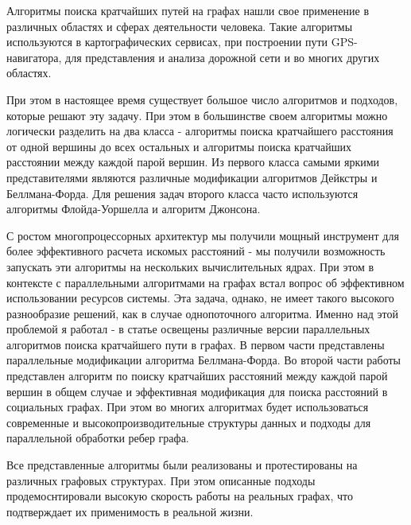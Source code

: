 \startprefacepage

Алгоритмы поиска кратчайших путей на графах нашли свое применение в различных областях и сферах деятельности человека. Такие алгоритмы используются в картографических сервисах, при построении пути GPS-навигатора, для представления и анализа дорожной сети и во многих других областях.
 
При этом в настоящее время существует большое число алгоритмов и подходов, которые решают эту задачу. При этом в большинстве своем алгоритмы можно логически разделить на два класса - алгоритмы поиска кратчайшего расстояния от одной вершины до всех остальных и алгоритмы поиска кратчайших расстоянии между каждой парой вершин. Из первого класса самыми яркими представителями являются различные модификации алгоритмов Дейкстры и Беллмана-Форда. Для решения задач второго класса часто используются алгоритмы Флойда-Уоршелла и алгоритм Джонсона. 

С ростом многопроцессорных архитектур мы получили мощный инструмент для более эффективного расчета искомых расстояний - мы получили возможность запускать эти алгоритмы на нескольких вычислительных ядрах. При этом в контексте с параллельными алгоритмами на графах встал вопрос об эффективном использовании ресурсов системы. Эта задача, однако, не имеет такого высокого разнообразие решений, как в случае однопоточного алгоритма. Именно над этой проблемой я работал - в статье освещены различные версии параллельных алгоритмов поиска кратчайшего пути в графах. В первом части представлены параллельные модификации алгоритма Беллмана-Форда. Во второй части работы представлен алгоритм по поиску кратчайших расстояний между каждой парой вершин в общем случае и эффективная модификация для поиска расстояний в социальных графах. При этом во многих алгоритмах будет использоваться современные и высокопроизводительные структуры данных и подходы для параллельной обработки ребер графа.

Все представленные алгоритмы были реализованы и протестированы на различных графовых структурах. При этом описанные подходы продемоснтировали высокую скорость работы на реальных графах, что подтверждает их применимость в реальной жизни.
\FloatBarrier
